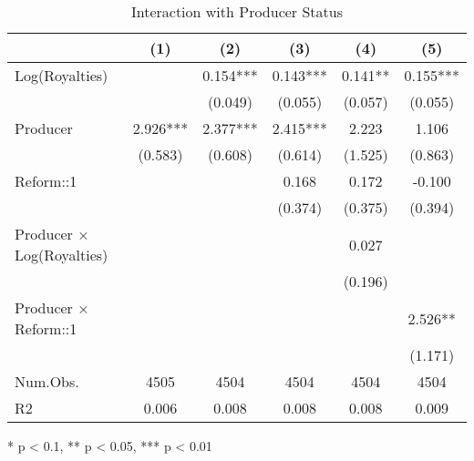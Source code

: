 \begin{table}[t]
\caption*{
{\large Interaction with Producer Status}
} 
\fontsize{12.0pt}{14.4pt}\selectfont
\begin{tabular*}{\linewidth}{@{\extracolsep{\fill}}lccccc}
\toprule
  & (1) & (2) & (3) & (4) & (5) \\ 
\midrule\addlinespace[2.5pt]
Log(Royalties) &  & 0.154*** & 0.143*** & 0.141** & 0.155*** \\ 
 &  & (0.049) & (0.055) & (0.057) & (0.055) \\ 
Producer & 2.926*** & 2.377*** & 2.415*** & 2.223 & 1.106 \\ 
 & (0.583) & (0.608) & (0.614) & (1.525) & (0.863) \\ 
Reform::1 &  &  & 0.168 & 0.172 & -0.100 \\ 
 &  &  & (0.374) & (0.375) & (0.394) \\ 
Producer × Log(Royalties) &  &  &  & 0.027 &  \\ 
 &  &  &  & (0.196) &  \\ 
Producer × Reform::1 &  &  &  &  & 2.526** \\ 
{} & {} & {} & {} & {} & {(1.171)} \\ 
Num.Obs. & 4505 & 4504 & 4504 & 4504 & 4504 \\ 
R2 & 0.006 & 0.008 & 0.008 & 0.008 & 0.009 \\ 
\bottomrule
\end{tabular*}
\begin{minipage}{\linewidth}
* p < 0.1, ** p < 0.05, *** p < 0.01\\
\end{minipage}
\end{table}

